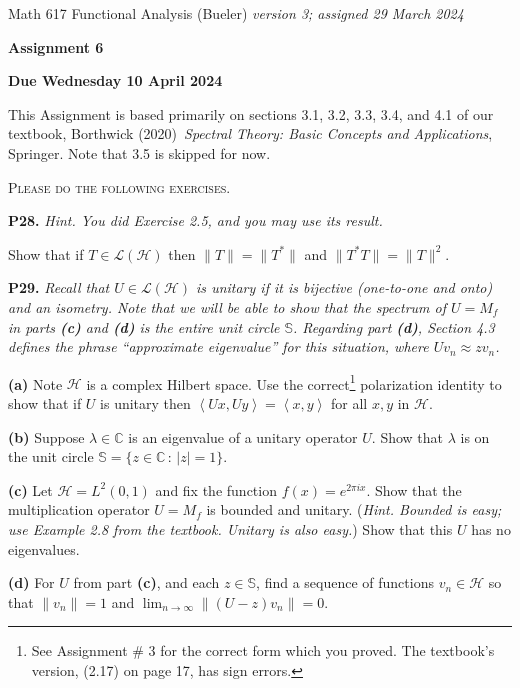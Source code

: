 \documentclass[12pt]{amsart}
\newcommand{\cH}{\mathcal{H}}
\newcommand{\cL}{\mathcal{L}}
\newcommand{\CC}{\mathbb{C}}
\newcommand{\ip}[2]{\ensuremath{\left<#1,#2\right>}}
\newcommand{\prob}[1]{\bigskip\noindent\textbf{#1.}\quad }
\newcommand{\epart}[1]{\medskip\noindent\textbf{(#1)}\quad }
\newcommand{\ds}{\displaystyle}
\begin{document}
\scriptsize \noindent Math 617 Functional Analysis (Bueler) \hfill \emph{version 3; assigned 29 March 2024}
\normalsize\medskip

\Large\centerline{\textbf{Assignment 6}}
\large
\medskip

\centerline{\textbf{Due Wednesday 10 April 2024}}
\medskip
\normalsize

\thispagestyle{empty}

\bigskip
\noindent This Assignment is based primarily on sections 3.1, 3.2, 3.3, 3.4, and 4.1 of our textbook, Borthwick (2020)~\emph{Spectral Theory: Basic Concepts and Applications}, Springer.  Note that 3.5 is skipped for now.

\medskip
\noindent \textsc{Please do the following exercises.}
\smallskip

\renewcommand{\SS}{\mathbb{S}}

\prob{P28}  \emph{Hint.  You did Exercise 2.5, and you may use its result.}

\medskip\noindent Show that if $T\in\cL(\cH)$ then $\|T\|=\|T^*\|$ and $\|T^*T\|=\|T\|^2$.


\prob{P29}  \emph{Recall that $U\in\cL(\cH)$ is \emph{unitary} if it is bijective (one-to-one and onto) and an isometry.  Note that we will be able to show that the spectrum of $U=M_f$ in parts \emph{\textbf{(c)}} and \emph{\textbf{(d)}} is the entire unit circle $\SS$.  Regarding part \emph{\textbf{(d)}}, Section 4.3 defines the phrase ``approximate eigenvalue'' for this situation, where $Uv_n \approx zv_n$.}

\epart{a}  Note $\cH$ is a complex Hilbert space.  Use the correct\footnote{See Assignment \# 3 for the correct form which you proved.  The textbook's version, (2.17) on page 17, has sign errors.} polarization identity to show that if $U$ is unitary then $\ip{Ux}{Uy}=\ip{x}{y}$ for all $x,y$ in $\cH$.

\epart{b}  Suppose $\lambda \in\CC$ is an eigenvalue of a unitary operator $U$.  Show that $\lambda$ is on the unit circle $\SS = \{z\in\CC\,:\,|z|=1\}$.

\epart{c}  Let $\cH = L^2(0,1)$ and fix the function $f(x) = e^{2\pi i x}$.  Show that the multiplication operator $U=M_f$ is bounded and unitary.  (\emph{Hint. Bounded is easy; use Example 2.8 from the textbook. Unitary is also easy.})  Show that this $U$ has no eigenvalues.

\epart{d}  For $U$ from part \textbf{(c)}, and each $z\in\SS$, find a sequence of functions $v_n\in\cH$ so that $\|v_n\|=1$ and $\ds \lim_{n\to\infty} \|(U-z)v_n\|=0$.
\end{document}

